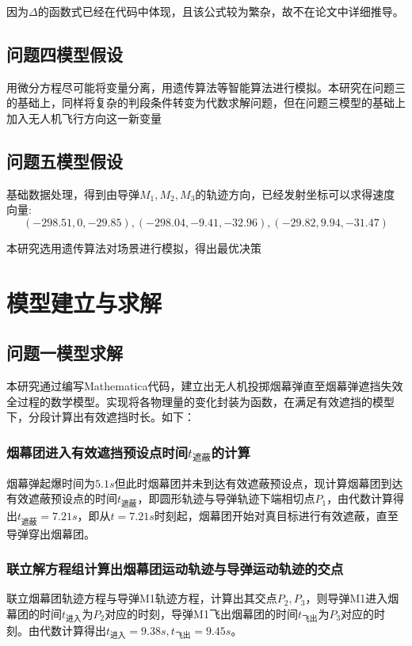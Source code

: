 \documentclass{article}
\begin{document}
因为$\Delta$的函数式已经在代码中体现，且该公式较为繁杂，故不在论文中详细推导。
\subsection{问题四模型假设}
用微分方程尽可能将变量分离，用遗传算法等智能算法进行模拟。本研究在问题三的基础上，同样将复杂的判段条件转变为代数求解问题，但在问题三模型的基础上加入无人机飞行方向这一新变量

\subsection{问题五模型假设}
基础数据处理，得到由导弹$M_1,M_2,M_3$的轨迹方向，已经发射坐标可以求得速度向量:
$$(-298.51,0,-29.85),(-298.04,-9.41,-32.96),(-29.82,9.94,-31.47)$$

本研究选用遗传算法对场景进行模拟，得出最优决策

\section{模型建立与求解}

\subsection{问题一模型求解}

本研究通过编写Mathematica代码，建立出无人机投掷烟幕弹直至烟幕弹遮挡失效全过程的数学模型。实现将各物理量的变化封装为函数，在满足有效遮挡的模型下，分段计算出有效遮挡时长。如下：

\subsubsection{烟幕团进入有效遮挡预设点时间$t_\text{遮蔽}$的计算}
烟幕弹起爆时间为$5.1s$但此时烟幕团并未到达有效遮蔽预设点，现计算烟幕团到达有效遮蔽预设点的时间$t_\text{遮蔽}$，即圆形轨迹与导弹轨迹下端相切点$P_1$，由代数计算得出$t_\text{遮蔽} = 7.21s$，即从$t=7.21s$时刻起，烟幕团开始对真目标进行有效遮蔽，直至导弹穿出烟幕团。

\subsubsection{联立解方程组计算出烟幕团运动轨迹与导弹运动轨迹的交点}
联立烟幕团轨迹方程与导弹M1轨迹方程，计算出其交点$P_2,P_3$，则导弹M1进入烟幕团的时间$t_{\text{进入}}$为$P_2$对应的时刻，导弹M1飞出烟幕团的时间$t_{\text{飞出}}$为$P_3$对应的时刻。由代数计算得出$t_{\text{进入}} = 9.38s,t_{\text{飞出}} = 9.45s$。
\end{document}
